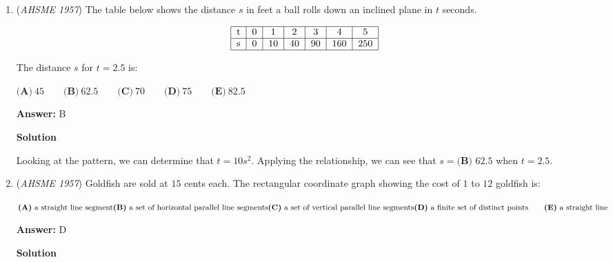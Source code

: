 \begin{enumerate}
\textbf{Solution}

In order to solve the problem, we will use two properties, namely, that $(a+b)^2=a^2+2ab+b^2$ and $(a-b)^2=a^2-2ab+b^2$.

 We can use this to simplify the equation, as $y = \sqrt{x^2 - 2x + 1} + \sqrt{x^2 + 2x + 1}$ turns into $y = x + 1 + x - 1$. However, the square root function only allows for nonnegative inputs and only generates nonnegative outputs, so $y$ is $\boxed{\textbf{(D) }|x+1|+|x-1|}$.

 


	\item (\textit{AHSME 1957}) The table below shows the distance $s$ in feet a ball rolls down an inclined plane in $t$ seconds. 


 
 \[\begin{tabular}{|c|c|c|c|c|c|c|}\hline t & 0 & 1 & 2 & 3 & 4 & 5\\ \hline s & 0 & 10 & 40 & 90 & 160 & 250\\ \hline\end{tabular}\]


 The distance $s$ for $t = 2.5$ is: 


 $\textbf{(A)}\ 45\qquad \textbf{(B)}\ 62.5\qquad \textbf{(C)}\ 70\qquad \textbf{(D)}\ 75\qquad \textbf{(E)}\ 82.5$

 \textbf{Answer: }B



\textbf{Solution}

Looking at the pattern, we can determine that $t=10s^2$. Applying the relationship, we can see that $s = \boxed{\textbf{(B) }62.5}$ when $t=2.5$.

 


	\item (\textit{AHSME 1957}) Goldfish are sold at $15$ cents each. The rectangular coordinate graph showing the cost of $1$ to $12$ goldfish is: 


 $\textbf{(A)}\ \text{a straight line segment} \qquad \\  \textbf{(B)}\ \text{a set of horizontal parallel line segments}\qquad\\  \textbf{(C)}\ \text{a set of vertical parallel line segments}\qquad\\  \textbf{(D)}\ \text{a finite set of distinct points} \qquad\textbf{(E)}\ \text{a straight line}$

 \textbf{Answer: }D



\textbf{Solution}


\end{enumerate}
